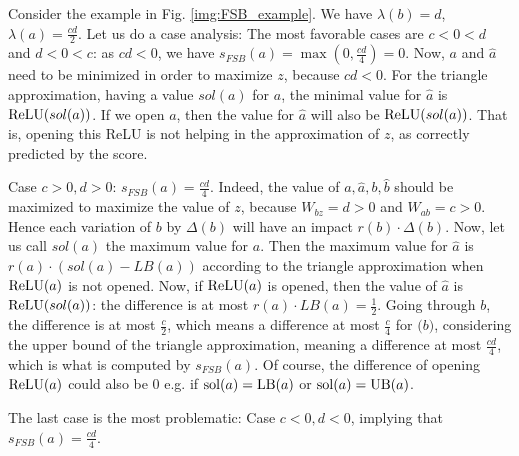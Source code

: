 Consider the example in Fig. \ref{img:FSB_example}.
We have $\lambda(b)=d$, $\lambda(a)=\frac{cd}{2}$.
Let us do a case analysis:
The most favorable cases are $c < 0 < d$ and $d < 0 < c$: 
as $cd <0$, we have $s_{FSB}(a)=\max(0,\frac{cd}{4}) = 0$.
Now, $a$ and $\hat{a}$ need to be minimized in order to maximize $z$, because $cd <0$. 
For the triangle approximation, having a value $sol(a)$ for $a$, the minimal value for $\hat{a}$ is $\mathrm{ReLU}(sol(a))$. If we open $a$, then the value for $\hat{a}$ will also be $\mathrm{ReLU}(sol(a))$. That is, opening this ReLU is not helping in the approximation of $z$, as correctly predicted by the score.

Case $c>0,d>0$: $s_{FSB}(a)=\frac{cd}{4}$.
Indeed, the value of $a,\hat{a},b,\hat{b}$ should be maximized to maximize the value of $z$, because $W_{bz}=d>0$ and $W_{ab}=c>0$. Hence each variation of $b$ by $\Delta(b)$ will have an impact $r(b) \cdot \Delta(b)$.
Now, let us call $sol(a)$ the maximum value for $a$.
Then the maximum value for $\hat{a}$ is $r(a)\cdot (sol(a)-LB(a))$ according to the triangle approximation when $\mathrm{ReLU}(a)$ is not opened. Now, if $\mathrm{ReLU}(a)$ is opened, then 
the value of $\hat{a}$ is $\mathrm{ReLU}(sol(a))$: the difference is at most $r(a) \cdot LB(a) = \frac{1}{2}$. Going through $b$, the difference is at most $\frac{c}{2}$, which means a difference at most $\frac{c}{4}$ for $\hat(b)$, considering the upper bound of the triangle approximation, meaning a difference at most $\frac{cd}{4}$, which is what is computed by 
$s_{FSB}(a)$. Of course, the difference of opening $\mathrm{ReLU}(a)$ could also be 0 e.g. if $\mathrm{sol}(a)=\mathrm{LB}(a)$ or $\mathrm{sol}(a)=\mathrm{UB}(a)$.

The last case is the most problematic: 
Case $c<0,d<0$, implying that $s_{FSB}(a)=\frac{cd}{4}$.


